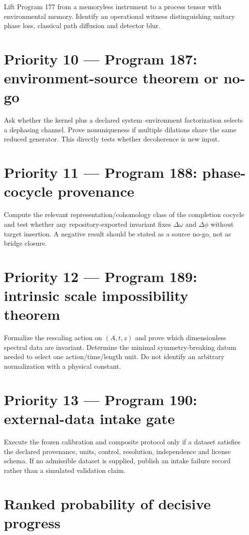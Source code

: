\documentclass[11pt,a4paper,openany]{report}
\begin{document}
Lift Program 177 from a memoryless instrument to a process tensor with environmental memory. Identify an operational witness distinguishing unitary phase loss, classical path diffusion and detector blur.

\section{Priority 10 --- Program 187: environment-source theorem or no-go}

Ask whether the kernel plus a declared system--environment factorization selects a dephasing channel. Prove nonuniqueness if multiple dilations share the same reduced generator. This directly tests whether decoherence is new input.

\section{Priority 11 --- Program 188: phase-cocycle provenance}

Compute the relevant representation/\allowbreak{}cohomology class of the completion cocycle and test whether any repository-exported invariant fixes \(\Delta\omega\) and \(\Delta\phi\) without target insertion. A negative result should be stated as a source no-go, not as bridge closure.

\section{Priority 12 --- Program 189: intrinsic scale impossibility theorem}

Formalize the rescaling action on \((A,t,z)\) and prove which dimensionless spectral data are invariant. Determine the minimal symmetry-breaking datum needed to select one action/\allowbreak{}time/\allowbreak{}length unit. Do not identify an arbitrary normalization with a physical constant.

\section{Priority 13 --- Program 190: external-data intake gate}

Execute the frozen calibration and composite protocol only if a dataset satisfies the declared provenance, units, control, resolution, independence and license schema. If no admissible dataset is supplied, publish an intake failure record rather than a simulated validation claim.

\section{Ranked probability of decisive progress}
\end{document}
